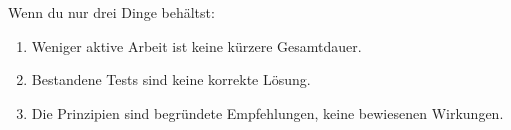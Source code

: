 \documentclass[11pt,a4paper,parskip=half]{scrartcl}
\begin{document}
\vfill
\begin{merke}
Wenn du nur drei Dinge behältst:
\begin{enumerate}
\item Weniger aktive Arbeit ist keine kürzere Gesamtdauer.
\item Bestandene Tests sind keine korrekte Lösung.
\item Die Prinzipien sind begründete Empfehlungen, keine bewiesenen Wirkungen.
\end{enumerate}
\end{merke}
\end{document}
